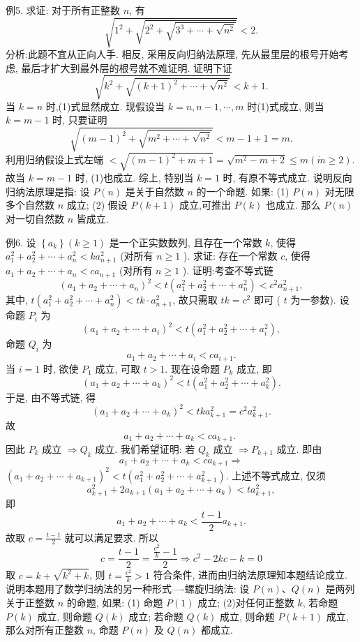 例5. 求证: 对于所有正整数 $n$, 有
$$
\sqrt{1^2+\sqrt{2^2+\sqrt{3^3+\cdots+\sqrt{n^2}}}}<2 .
$$
分析:此题不宜从正向人手.
相反, 采用反向归纳法原理, 先从最里层的根号开始考虑, 最后才扩大到最外层的根号就不难证明.
证明下证
$$
\sqrt{k^2+\sqrt{(k+1)^2+\cdots+\sqrt{n^2}}}<k+1 . \label{(1)}
$$
当 $k=n$ 时,(1)式显然成立.
现假设当 $k=n, n-1, \cdots, m$ 时(1)式成立, 则当 $k=m-1$ 时, 只要证明
$$
\sqrt{(m-1)^2+\sqrt{m^2+\cdots+\sqrt{n^2}}}<m-1+1=m .
$$
利用归纳假设上式左端 $<\sqrt{(m-1)^2+m+1}=\sqrt{m^2-m+2} \leqslant m(\dot{m} \geqslant 2)$.
故当 $k=m-1$ 时, (1)也成立.
综上, 特别当 $k=1$ 时, 有原不等式成立.
说明反向归纳法原理是指: 设 $P(n)$ 是关于自然数 $n$ 的一个命题.
如果:
(1) $P(n)$ 对无限多个自然数 $n$ 成立;
(2) 假设 $P(k+1)$ 成立,可推出 $P(k)$ 也成立.
那么 $P(n)$ 对一切自然数 $n$ 皆成立.



例6. 设 $\left\{a_k\right\}(k \geqslant 1)$ 是一个正实数数列, 且存在一个常数 $k$, 使得 $a_1^2+ a_2^2+\cdots+a_n^2<k a_{n+1}^2$ (对所有 $n \geqslant 1$ ). 求证: 存在一个常数 $c$, 使得 $a_1+a_2+\cdots+ a_n<c a_{n+1}$ (对所有 $n \geqslant 1$ ).
证明:考查不等式链
$$
\left(a_1+a_2+\cdots+a_n\right)^2<t\left(a_1^2+a_2^2+\cdots+a_n^2\right)<c^2 a_{n+1}^2,
$$
其中, $t\left(a_1^2+a_2^2+\cdots+a_n^2\right)<t k \cdot a_{n+1}^2$, 故只需取 $t k=c^2$ 即可 ( $t$ 为一参数).
设命题 $P_i$ 为
$$
\left(a_1+a_2+\cdots+a_i\right)^2<t\left(a_1^2+a_2^2+\cdots+a_i^2\right),
$$
命题 $Q_i$ 为
$$
a_1+a_2+\cdots+a_i<c a_{i+1} .
$$
当 $i=1$ 时, 欲使 $P_1$ 成立, 可取 $t>1$.
现在设命题 $P_k$ 成立, 即
$$
\left(a_1+a_2+\cdots+a_k\right)^2<t\left(a_1^2+a_2^2+\cdots+a_k^2\right) .
$$
于是, 由不等式链, 得
$$
\left(a_1+a_2+\cdots+a_k\right)^2<t k a_{k+1}^2=c^2 a_{k+1}^2 .
$$
故
$$
a_1+a_2+\cdots+a_k<c a_{k+1} \text {. }
$$
因此
$P_k$ 成立 $\Rightarrow Q_k$ 成立.
我们希望证明: 若 $Q_k$ 成立 $\Rightarrow P_{k+1}$ 成立.
即由
$$
a_1+a_2+\cdots+a_k<c a_{k+1} \Rightarrow
$$
$\left(a_1+a_2+\cdots+a_{k+1}\right)^2<t\left(a_1^2+a_2^2+\cdots+a_{k+1}^2\right)$.
上述不等式成立, 仅须
$$
a_{k+1}^2+2 a_{k+1}\left(a_1+a_2+\cdots+a_k\right)<t a_{k+1}^2,
$$
即
$$
a_1+a_2+\cdots+a_k<\frac{t-1}{2} a_{k+1} .
$$
故取 $c=\frac{t-1}{2}$ 就可以满足要求.
所以
$$
c=\frac{t-1}{2}=\frac{\frac{c^2}{k}-1}{2} \Rightarrow c^2-2 k c-k=0
$$
取 $c=k+\sqrt{k^2+k}$, 则 $t=\frac{c^2}{k}>1$ 符合条件, 进而由归纳法原理知本题结论成立.
说明本题用了数学归纳法的另一种形式—-螺旋归纳法:
设 $P(n) 、 Q(n)$ 是两列关于正整数 $n$ 的命题, 如果:
(1) 命题 $P(1)$ 成立;
(2)对任何正整数 $k$, 若命题 $P(k)$ 成立, 则命题 $Q(k)$ 成立; 若命题 $Q(k)$ 成立, 则命题 $P(k+1)$ 成立, 那么对所有正整数 $n$, 命题 $P(n)$ 及 $Q(n)$ 都成立.



